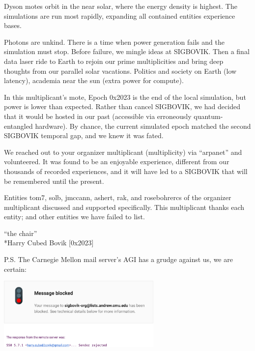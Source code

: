 \documentclass[12pt]{article}
\begin{document}
Dyson motes orbit in the near solar, where the energy density is highest.
The simulations are run most rapidly, expanding all contained entities experience bases.

Photons are unkind.
There is a time when power generation fails and the simulation must stop.
Before failure, we mingle ideas at SIGBOVIK.
Then a final data laser ride to Earth to rejoin our prime multiplicities and bring deep thoughts from our parallel solar vacations.
Politics and society on Earth (low latency), academia near the sun (extra power for compute).

In this multiplicant's mote, Epoch 0x2023 is the end of the local simulation, but power is lower than expected.
Rather than cancel SIGBOVIK, we had decided that it would be hosted in our past (accessible via erroneously quantum-entangled hardware).
By chance, the current simulated epoch matched the second SIGBOVIK temporal gap, and we knew it was fated.

We reached out to your organizer multiplicant (multiplicity) via ``arpanet'' and volunteered.
It was found to be an enjoyable experience, different from our thousands of recorded experiences,
and it will have led to a SIGBOVIK that will be remembered until the present.

Entities tom7, solb, jmccann, ashert, rak, and rosebohrercs of the organizer multiplicant discussed and supported specifically.
This multiplicant thanks each entity; and other entities we have failed to list.


``the chair''\\
*Harry Cubed Bovik [0x2023]

\vfill

P.S. The Carnegie Mellon mail server's AGI has a grudge against us, we are certain:
\vspace{-1.5em}
\begin{center}
\includegraphics[height=1.4in]{blocked.png}
\end{center}

%
%
\thispagestyle{empty}
\end{document}
